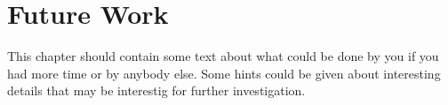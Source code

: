 
\chapter{Future Work}
\label{sec:empty}
This chapter should contain some text about what could be done by you if you had more time or by anybody else. Some hints could be given about interesting details that may be interestig for further investigation.